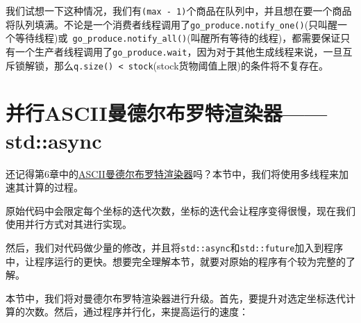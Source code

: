 我们试想一下这种情况，我们有\texttt{(max - 1)}个商品在队列中，并且想在要一个商品将队列填满。不论是一个消费者线程调用了\texttt{go\_produce.notify\_one()}(只叫醒一个等待线程)或\texttt{ go\_produce.notify\_all()}(叫醒所有等待的线程)，都需要保证只有一个生产者线程调用了\texttt{go\_produce.wait}，因为对于其他生成线程来说，一旦互斥锁解锁，那么\texttt{q.size() < stock}(stock货物阈值上限)的条件将不复存在。


\section{并行ASCII曼德尔布罗特渲染器——std::async}

还记得第6章中的\href{content/chapter6/chapter6-5-chinese.md}{ASCII曼德尔布罗特渲染器}吗？本节中，我们将使用多线程来加速其计算的过程。

原始代码中会限定每个坐标的迭代次数，坐标的迭代会让程序变得很慢，现在我们使用并行方式对其进行实现。

然后，我们对代码做少量的修改，并且将\texttt{std::async}和\texttt{std::future}加入到程序中，让程序运行的更快。想要完全理解本节，就要对原始的程序有个较为完整的了解。


本节中，我们将对曼德尔布罗特渲染器进行升级。首先，要提升对选定坐标迭代计算的次数。然后，通过程序并行化，来提高运行的速度：

